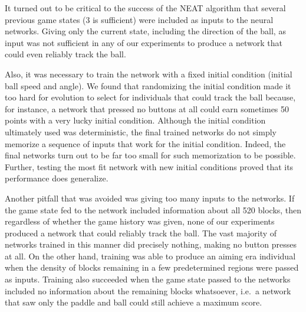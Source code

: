\documentclass[letterpaper, twocolumn]{article}
\begin{document}
It turned out to be critical to the success of the NEAT algorithm that several previous game states (3 is sufficient) were included as inputs to the neural networks.
Giving only the current state, including the direction of the ball, as input was not sufficient in any
of our experiments to produce a network that could even reliably track the ball.

Also, it was necessary to train the network with a fixed initial condition (initial ball speed and angle).
We found that randomizing the initial condition made it too hard for evolution to select for individuals
that could track the ball because, for instance,
a network that pressed no buttons at all could earn sometimes 50 points with a very lucky initial condition.
Although the initial condition ultimately used was deterministic,
the final trained networks do not simply memorize a sequence of inputs that work for the initial condition.
Indeed, the final networks turn out to be far too small for such memorization to be possible.
Further, testing the most fit network with new initial conditions proved that its performance does generalize.

Another pitfall that was avoided was giving too many inputs to the networks.
If the game state fed to the network
included information about all 520 blocks, then regardless of whether the game history was given,
none of our experiments produced a network that could reliably track the ball.
The vast majority of networks trained in this manner did precisely nothing, making no button presses
at all.
On the other hand, training was able to produce an aiming era individual
when the density of blocks remaining in a few predetermined regions were passed as inputs.
Training also succeeded when the game state passed to the networks included no information about the remaining blocks whatsoever, i.e.\ a network that saw only the paddle and ball could still achieve a maximum score.
\end{document}
